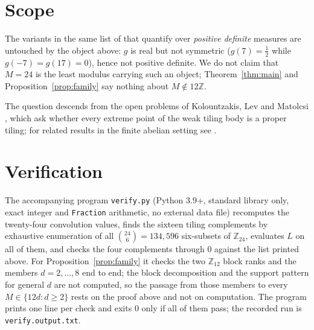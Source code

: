 \documentclass[11pt]{amsart}
\theoremstyle{definition}
\theoremstyle{remark}
\newcommand{\Zn}[1]{\mathbb Z_{#1}}
\begin{document}
\section{Scope}

The variants in the same list of \cite{KF} that quantify over \emph{positive
definite} measures are untouched by the object above: $g$ is real but not
symmetric ($g(7)=\tfrac12$ while $g(-7)=g(17)=0$), hence not positive definite.
We do not claim that $M=24$ is the least modulus carrying such an object;
Theorem~\ref{thm:main} and Proposition~\ref{prop:family} say nothing about
$M\notin12\mathbb Z$.

The question descends from the open problems of Kolountzakis, Lev and Matolcsi
\cite{KLM1}, which ask whether every extreme point of the weak tiling body is a
proper tiling; for related results in the finite abelian setting see
\cite{KLMS,KLMS2}.

\section{Verification}

The accompanying program \texttt{verify.py} (Python 3.9+, standard library only,
exact integer and \texttt{Fraction} arithmetic, no external data file)
recomputes the twenty-four convolution values, finds the sixteen tiling
complements by exhaustive enumeration of all $\binom{24}{6}=134{,}596$
six-subsets of $\Zn{24}$, evaluates $L$ on all of them, and checks the four
complements through $0$ against the list printed above. For
Proposition~\ref{prop:family} it checks the two $\Zn{12}$ block ranks and the
members $d=2,\ldots,8$ end to end; the block decomposition and the support
pattern for general $d$ are not computed, so the passage from those members to
every $M\in\{12d : d\ge2\}$ rests on the proof above and not on computation. The
program prints one line per check and exits $0$ only if all of them pass; the
recorded run is \texttt{verify.output.txt}.
\end{document}
